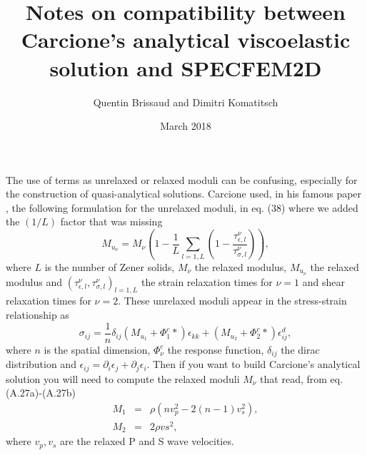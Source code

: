 \documentclass[a4paper,12pt]{article}
\title{Notes on compatibility between Carcione's analytical viscoelastic solution and SPECFEM2D}
\author{Quentin Brissaud and Dimitri Komatitsch}
\date{March 2018}
\renewcommand{\cite}[1]{\citet{#1}}
\begin{document}
\Large

\maketitle

The use of terms as unrelaxed or relaxed moduli can be confusing, especially for the construction of quasi-analytical solutions. Carcione used, in his famous paper \cite{CaKoKo88b}, the following formulation for the unrelaxed moduli, in eq. (38) where we added the $(1/L)$ factor that was missing
\begin{equation}
M_{u_\nu} = M_\nu\left(1-\frac{1}{L}\sum_{l=1,L}(1-\frac{\tau^\nu_{\epsilon,l}}{\tau^\nu_{\sigma,l}})\right),
\end{equation}
where $L$ is the number of Zener solids, $M_\nu$ the relaxed modulus, $M_{u_\nu}$ the relaxed modulus and $(\tau^\nu_{\epsilon,l},\tau^\nu_{\sigma,l})_{l=1,L}$ the strain relaxation times for $\nu = 1$ and shear relaxation times for $\nu = 2$. These unrelaxed moduli appear in the stress-strain relationship as
\begin{equation}
\sigma_{ij} = \frac{1}{n}\delta_{ij}(M_{u_1}+\Phi^c_1*)\epsilon_{kk}+(M_{u_2}+\Phi^c_2*)\epsilon^d_{ij},
\end{equation}
where $n$ is the spatial dimension, $\Phi^c_\nu$ the response function, $\delta_{ij}$ the dirac distribution and $\epsilon_{ij} = \partial_i\epsilon_j + \partial_j\epsilon_i$. Then if you want to build Carcione's analytical solution you will need to compute the relaxed moduli $M_\nu$ that read, from eq. (A.27a)-(A.27b)
\begin{equation}
\begin{array}{rcl}
M_1 &=& \rho(nv_p^2-2(n-1)v_s^2),\\
M_2 &=& 2\rho vs^2,
\end{array}
\end{equation}
where $v_p, v_s$ are the relaxed P and S wave velocities. \\
\end{document}
